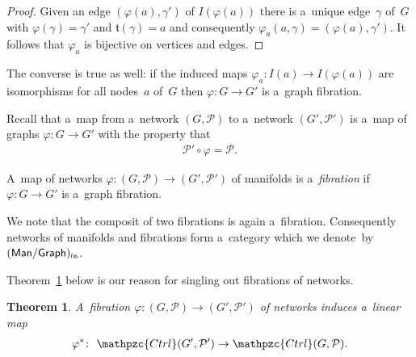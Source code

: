 \documentclass[pdftex]{sigma}
\numberwithin{equation}{section}
\newtheorem{Theorem}{Theorem}[section]
\begin{document}
\begin{proof}
Given an edge $(\varphi(a), \gamma')$ of $I(\varphi(a))$ there is a~unique edge~$\gamma$ of~$G$ with $\varphi(\gamma) =
\gamma'$ and $\mathfrak t(\gamma) = a$ and consequently $\varphi_a (a,\gamma) = (\varphi(a),\gamma')$.
It follows that $\varphi_a$ is bijective on vertices and edges.
\end{proof}
\begin{Remark}
The converse is true as well: if the induced maps $\varphi_a\colon I(a)\to I(\varphi(a))$ are isomorphisms for all
nodes~$a$ of~$G$ then $\varphi\colon G\to G'$ is a~graph f\/ibration.
\end{Remark}

Recall that a~map from a~network $(G,{\mathcal P})$ to a~network $(G',{\mathcal P}')$ is a~map of graphs $\varphi\colon
G\to G'$ with the property that
\begin{gather*}
{\mathcal P}'\circ \varphi = {\mathcal P}.
\end{gather*}

\begin{Definition}
A~map of networks $\varphi\colon (G,{\mathcal P}) \to (G',{\mathcal P}')$ of
manifolds is a~{\it fibration} if $\varphi\colon G\to G'$ is a~graph f\/ibration.
\end{Definition}
\begin{Remark} We note
that the composit of two f\/ibrations is again a~f\/ibration.
Consequently networks of manifolds and f\/ibrations form a~category which we denote~by
$(\mathsf{Man}/\mathsf{Graph})_{\mbox{\sf{\tiny{f\/ib}}}} $.
\end{Remark}
Theorem~\ref{thm:4.4} below is our reason for singling out f\/ibrations of networks.
\begin{Theorem}
\label{thm:4.4}
A~fibration $\varphi\colon (G,{\mathcal P})\to (G',{\mathcal P}')$ of networks induces a~linear map
\begin{gather*}
\varphi^*\colon \ \mathpzc{Ctrl}(G',{\mathcal P}')\to \mathpzc{Ctrl}(G,{\mathcal P}).
\end{gather*}
\end{Theorem}
\end{document}
